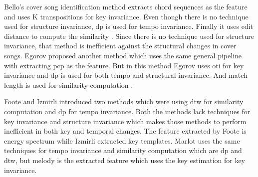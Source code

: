 Bello's cover song identification method extracts chord sequences as the feature and
uses K transpositions for key invariance. Even though there is no technique used
for structure invariance, \ac{dp} is used for tempo invariance. Finally
it uses edit distance to compute the similarity \cite{Chord}. Since there is no technique
used for structure invariance, that method is inefficient against the structural changes
in cover songs. Egorov proposed another method which uses the same general pipeline with
extracting \ac{pcp} as the feature. But in this method Egorov uses \ac{oti} for key
invariance and \ac{dp} is used for both tempo and structural invariance. And match length
is used for similarity computation \cite{PCP}.

Foote \cite{Energy} and Izmirli \cite{KeyTemplates} introduced two methods which were using
\ac{dtw} for similarity computation and \ac{dp} for tempo invariance. Both the methods lack
techniques for key invariance and structure invariance which makes those methods to perform
inefficient in both key and temporal changes. The feature extracted by Foote is energy spectrum
while Izmirli extracted key templates. Marlot uses the same techniques for tempo invariance and
similarity computation which are \ac{dp} and \ac{dtw}, but melody is the extracted feature
which uses the key estimation for key invariance.

